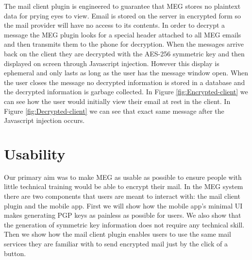 \documentclass[10pt]{article}
\begin{document}
\begin{multicols}{2}
\par The mail client plugin is engineered to guarantee that MEG stores no plaintext data for prying eyes to view. Email is stored on the server in encrypted form so the mail provider will have no access to its contents. In order to decrypt a message the MEG plugin looks for a special header attached to all MEG emails and then transmits them to the phone for decryption. When the messages arrive back on the client they are decrypted with the AES-256 symmetric key and then displayed on screen through Javascript injection. However this display is ephemeral and only lasts as long as the user has the message window open. When the user closes the message no decrypted information is stored in a database and the decrypted information is garbage collected. In Figure \ref{fig:Encrypted-client} we can see how the user would initially view their email at rest in the client. In Figure \ref{fig:Decrypted-client} we can see that exact same message after the Javascript injection occurs.
\section{Usability}
Our primary aim was to make MEG as usable as possible to ensure people with little technical training would be able to encrypt their mail. In the MEG system there are two components that users are meant to interact with: the mail client plugin and the mobile app. First we will show how the mobile app's minimal UI makes generating PGP keys as painless as possible for users. We also show that the generation of symmetric key information does not require any technical skill. Then we show how the mail client plugin enables users to use the same mail services they are familiar with to send encrypted mail just by the click of a button.

\end{multicols}
\end{document}
